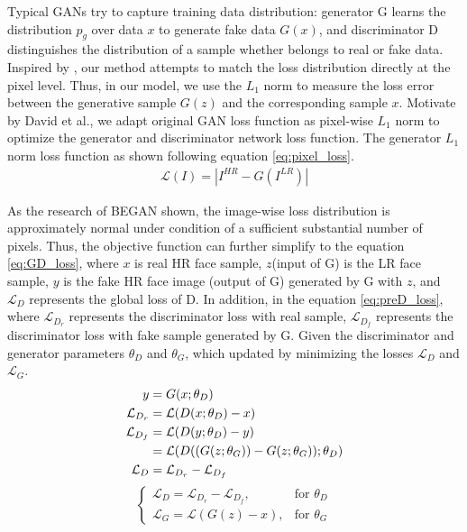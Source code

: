 \documentclass[conference,compsoc]{IEEEtran}
\begin{document}
Typical GANs try to capture training data distribution\cite{Goodfellow2014GAN}: generator G learns the distribution $p_g$ over data $x$ to generate fake data $G(x)$, and discriminator D distinguishes the distribution of a sample whether belongs to real or fake data. Inspired by \cite{Arjovsky2017WGAN, zhao2016EBGAN}, our method attempts to match the loss distribution directly at the pixel level. Thus, in our model, we use the $L_1$ norm to measure the loss error between the generative sample $G(z)$ and the corresponding sample $x$. Motivate by David et al.\cite{David-BEGAN2017}, we adapt original GAN\cite{Goodfellow2014GAN} loss function as pixel-wise $L_1$ norm to optimize the generator and discriminator network loss function. The generator $L_1$ norm loss function as shown following equation \ref{eq:pixel_loss}.
\begin{align}\label{eq:pixel_loss}
    \mathcal{L}(I) = |I^{HR}-G(I^{LR})|
\end{align}


As the research of BEGAN\cite{David-BEGAN2017} shown, the image-wise loss distribution is approximately normal under condition of a sufficient substantial number of pixels. Thus, the objective function can further simplify to the equation \ref{eq:GD_loss}, where $x$ is real HR face sample, $z$(input of G) is the LR face sample, $y$ is the fake HR face image (output of G) generated by G with $z$, and $\mathcal{L}_D$ represents the global loss of D. In addition, in the equation \ref{eq:preD_loss}, where $\mathcal{L}_{D_r}$ represents the discriminator loss with real sample, $\mathcal{L}_{D_f}$ represents the discriminator loss with fake sample generated by G. Given the discriminator and generator parameters $\theta_D$ and $\theta_G$, which updated by minimizing the losses $\mathcal{L}_D$ and $\mathcal{L}_G$.
\begin{align}\label{eq:preD_loss}
y & = G(x;\theta_D) \\
\mathcal{L}_{D_r} & = \mathcal{L}(D(x;\theta_D)-x) \\
\mathcal{L}_{D_f} & = \mathcal{L}(D(y;\theta_D)-y) \notag \\
& = \mathcal{L}(D((G(z;\theta_G))-G(z;\theta_G));\theta_D)\\
\mathcal{L}_D & = \mathcal{L}_{D_r} - \mathcal{L}_{D_f}
\end{align}
\begin{equation}\label{eq:GD_loss}
  \begin{cases}
   \mathcal{L}_D = \mathcal{L}_{D_r} - \mathcal{L}_{D_f}, & \text{for } \theta_D \\
   \mathcal{L}_G = \mathcal{L}(G(z)-x), & \text{for } \theta_G
  \end{cases}
\end{equation}
\end{document}
